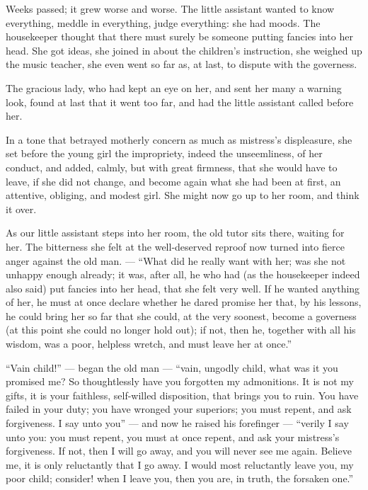 \documentclass[12pt,a4paper]{book}
\begin{document}
Weeks passed; it grew worse and worse. The little assistant wanted to know everything, meddle in everything, judge everything: she had moods. The housekeeper thought that there must surely be someone putting fancies into her head. She got ideas, she joined in about the children's instruction, she weighed up the music teacher, she even went so far as, at last, to dispute with the governess.

The gracious lady, who had kept an eye on her, and sent her many a warning look, found at last that it went too far, and had the little assistant called before her.

In a tone that betrayed motherly concern as much as mistress's displeasure, she set before the young girl the impropriety, indeed the unseemliness, of her conduct, and added, calmly, but with great firmness, that she would have to leave, if she did not change, and become again what she had been at first, an attentive, obliging, and modest girl. She might now go up to her room, and think it over.

As our little assistant steps into her room, the old tutor sits there, waiting for her. The bitterness she felt at the well-deserved reproof now turned into fierce anger against the old man. --- ``What did he really want with her; was she not unhappy enough already; it was, after all, he who had (as the housekeeper indeed also said) put fancies into her head, that she felt very well. If he wanted anything of her, he must at once declare whether he dared promise her that, by his lessons, he could bring her so far that she could, at the very soonest, become a governess (at this point she could no
longer hold out); if not, then he, together with all his wisdom, was a poor, helpless wretch, and must leave her at once.''

``Vain child!'' --- began the old man --- ``vain, ungodly child, what was it you promised me? So thoughtlessly have you forgotten my admonitions. It is not my gifts, it is your faithless, self-willed disposition, that brings you to ruin. You have failed in your duty; you have wronged your superiors; you must repent, and ask forgiveness. I say unto you'' --- and now he raised his forefinger --- ``verily I say unto you: you must repent, you must at once repent, and ask your mistress's forgiveness. If not, then I will go away, and you will never see me again. Believe me, it is only reluctantly that I go away. I would most reluctantly leave you, my poor child; consider! when I leave you, then you are, in truth, the forsaken one.''
\end{document}
